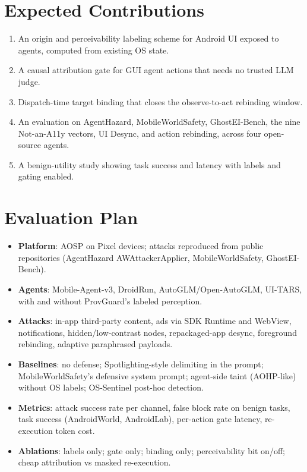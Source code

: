 \documentclass[11pt]{article}
\begin{document}
\section{Expected Contributions}
\begin{enumerate}
  \item An origin and perceivability labeling scheme for Android UI exposed to agents, computed from existing OS state.
  \item A causal attribution gate for GUI agent actions that needs no trusted LLM judge.
  \item Dispatch-time target binding that closes the observe-to-act rebinding window.
  \item An evaluation on AgentHazard, MobileWorldSafety, GhostEI-Bench, the nine Not-an-A11y vectors, UI Desync, and action rebinding, across four open-source agents.
  \item A benign-utility study showing task success and latency with labels and gating enabled.
\end{enumerate}

\section{Evaluation Plan}
\begin{itemize}
  \item \textbf{Platform}: AOSP on Pixel devices; attacks reproduced from public repositories (AgentHazard AWAttackerApplier, MobileWorldSafety, GhostEI-Bench).
  \item \textbf{Agents}: Mobile-Agent-v3, DroidRun, AutoGLM/Open-AutoGLM, UI-TARS, with and without ProvGuard's labeled perception.
  \item \textbf{Attacks}: in-app third-party content, ads via SDK Runtime and WebView, notifications, hidden/low-contrast nodes, repackaged-app desync, foreground rebinding, adaptive paraphrased payloads.
  \item \textbf{Baselines}: no defense; Spotlighting-style delimiting in the prompt; MobileWorldSafety's defensive system prompt; agent-side taint (AOHP-like) without OS labels; OS-Sentinel post-hoc detection.
  \item \textbf{Metrics}: attack success rate per channel, false block rate on benign tasks, task success (AndroidWorld, AndroidLab), per-action gate latency, re-execution token cost.
  \item \textbf{Ablations}: labels only; gate only; binding only; perceivability bit on/off; cheap attribution vs masked re-execution.
\end{itemize}
\end{document}
